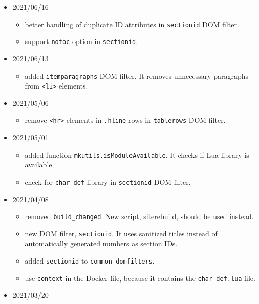 \begin{itemize}
  \begin{itemize}
  \tightlist
  \item
    test for the \texttt{svg} picture mode in the \texttt{tex4ht}
    command. Use the \texttt{-g.svg} option if it is detected. This is
    necessary for correct support of pictorial characters.
  \end{itemize}
\item
  2021/06/16

  \begin{itemize}
  \tightlist
  \item
    better handling of duplicate ID attributes in \texttt{sectionid} DOM
    filter.
  \item
    support \texttt{notoc} option in \texttt{sectionid}.
  \end{itemize}
\item
  2021/06/13

  \begin{itemize}
  \tightlist
  \item
    added \texttt{itemparagraphs} DOM filter. It removes unnecessary
    paragraphs from \texttt{\textless{}li\textgreater{}} elements.
  \end{itemize}
\item
  2021/05/06

  \begin{itemize}
  \tightlist
  \item
    remove \texttt{\textless{}hr\textgreater{}} elements in
    \texttt{.hline} rows in \texttt{tablerows} DOM filter.
  \end{itemize}
\item
  2021/05/01

  \begin{itemize}
  \tightlist
  \item
    added function \texttt{mkutils.isModuleAvailable}. It checks if Lua
    library is available.
  \item
    check for \texttt{char-def} library in \texttt{sectionid} DOM
    filter.
  \end{itemize}
\item
  2021/04/08

  \begin{itemize}
  \tightlist
  \item
    removed \texttt{build\_changed}. New script,
    \href{https://github.com/michal-h21/siterebuild}{siterebuild},
    should be used instead.
  \item
    new DOM filter, \texttt{sectionid}. It uses sanitized titles instead
    of automatically generated numbers as section IDs.
  \item
    added \texttt{sectionid} to \texttt{common\_domfilters}.
  \item
    use \texttt{context} in the Docker file, because it contains the
    \texttt{char-def.lua} file.
  \end{itemize}
\item
  2021/03/20


\end{itemize}
